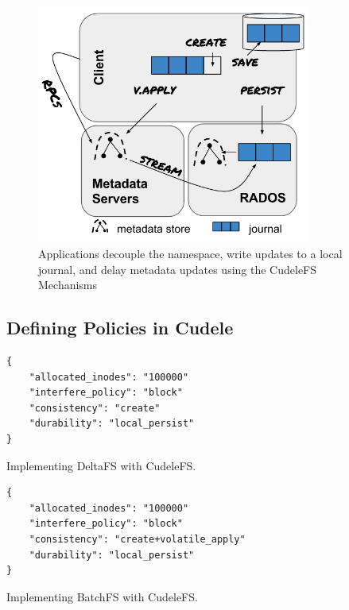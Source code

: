 \begin{figure}[tb]
\centering
\includegraphics[width=90mm]{figures/fig-decouple.png}
\caption{Applications decouple the namespace, write updates to a local journal,
and delay metadata updates using the CudeleFS Mechanisms }\label{fig:decouple}
\end{figure}

\subsection{Defining Policies in Cudele}
\label{sec:setting-policies-with-cudele}

\begin{listing}
\begin{verbatim}
{     
    "allocated_inodes": "100000"
    "interfere_policy": "block"
    "consistency": "create"
    "durability": "local_persist"
}
\end{verbatim}
\caption{Implementing DeltaFS with CudeleFS.}
\label{src:deltafs}
\end{listing}

\begin{listing}
\begin{verbatim}
{     
    "allocated_inodes": "100000"
    "interfere_policy": "block"
    "consistency": "create+volatile_apply"
    "durability": "local_persist"
}
\end{verbatim}
\caption{Implementing BatchFS with CudeleFS.}
\label{src:batchfs}
\end{listing}



